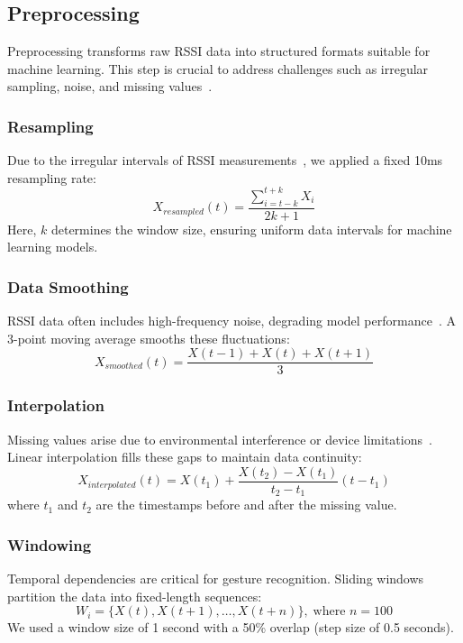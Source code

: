 \documentclass[10pt,twocolumn,letterpaper]{article}
\begin{document}
\subsection{Preprocessing}

Preprocessing transforms raw RSSI data into structured formats suitable for machine learning. This step is crucial to address challenges such as irregular sampling, noise, and missing values~\cite{haseeb2020wisture, abdelnasser2015wifi}.

\subsubsection{Resampling}
Due to the irregular intervals of RSSI measurements~\cite{abdelnasser2015wifi}, we applied a fixed 10ms resampling rate:
\begin{equation}
    X_{resampled}(t) = \frac{\sum_{i=t-k}^{t+k} X_i}{2k+1}
\end{equation}
Here, \( k \) determines the window size, ensuring uniform data intervals for machine learning models.

\subsubsection{Data Smoothing}
RSSI data often includes high-frequency noise, degrading model performance~\cite{haseeb2020wisture}. A 3-point moving average smooths these fluctuations:
\begin{equation}
    X_{smoothed}(t) = \frac{X(t-1) + X(t) + X(t+1)}{3}
\end{equation}

\subsubsection{Interpolation}
Missing values arise due to environmental interference or device limitations~\cite{wang2017wifi}. Linear interpolation fills these gaps to maintain data continuity:
\begin{equation}
    X_{interpolated}(t) = X(t_1) + \frac{X(t_2) - X(t_1)}{t_2 - t_1} (t - t_1)
\end{equation}
where \( t_1 \) and \( t_2 \) are the timestamps before and after the missing value.

\subsubsection{Windowing}
Temporal dependencies are critical for gesture recognition. Sliding windows~\cite{haseeb2020wisture} partition the data into fixed-length sequences:
\begin{equation}
    W_i = \{X(t), X(t+1), \ldots, X(t+n)\}, \; \text{where } n = 100
\end{equation}
We used a window size of 1 second with a 50\% overlap (step size of 0.5 seconds).
\end{document}
